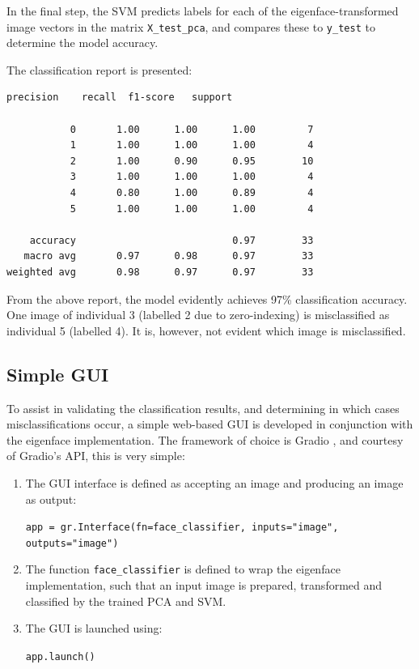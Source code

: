 In the final step, the SVM predicts labels for each of the eigenface-transformed image vectors in the matrix \texttt{X\_test\_pca}, and compares these to \texttt{y\_test} to determine the model accuracy.

The classification report is presented:

\vspace{1em}
\begin{lstlisting}[numbers=none, xleftmargin=5em]
           precision    recall  f1-score   support

           0       1.00      1.00      1.00         7
           1       1.00      1.00      1.00         4
           2       1.00      0.90      0.95        10
           3       1.00      1.00      1.00         4
           4       0.80      1.00      0.89         4
           5       1.00      1.00      1.00         4

    accuracy                           0.97        33
   macro avg       0.97      0.98      0.97        33
weighted avg       0.98      0.97      0.97        33
\end{lstlisting}

From the above report, the model evidently achieves 97\% classification accuracy. One image of individual 3 (labelled 2 due to zero-indexing) is misclassified as individual 5 (labelled 4). It is, however, not evident which image is misclassified.

\subsection{Simple GUI}

To assist in validating the classification results, and determining in which cases misclassifications occur, a simple web-based GUI is developed in conjunction with the eigenface implementation. The framework of choice is Gradio \cite{gradio_2023}, and courtesy of Gradio's API, this is very simple:

\begin{enumerate}
  \item The GUI interface is defined as accepting an image and producing an image as output:
  \begin{center}
    \texttt{app = gr.Interface(fn=face\_classifier, inputs="image", outputs="image")}
  \end{center}

  \item The function \texttt{face\_classifier} is defined to wrap the eigenface implementation, such that an input image is prepared, transformed and classified by the trained PCA and SVM.

  \item The GUI is launched using:
  \begin{center}
    \texttt{app.launch()}
  \end{center}

\end{enumerate}
\vspace{1em}


